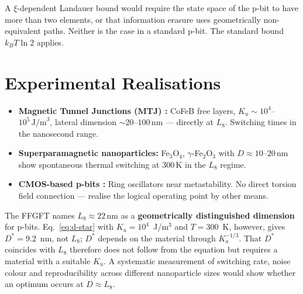 	\begin{important}
		A $\xi$-dependent Landauer bound would require the
		state space of the p-bit to have more than two elements, or that
		information erasure uses geometrically non-equivalent paths.
		Neither is the case in a standard p-bit.
		The standard bound $k_BT \ln 2$ applies.
	\end{important}
	
	\section{Experimental Realisations}
	\label{sec:experiment}
	
	\begin{itemize}
		\item \textbf{Magnetic Tunnel Junctions (MTJ) \cite{Borders2019}:}
		CoFeB free layers, $K_u \sim 10^4$--$10^5\,\text{J/m}^3$,
		lateral dimension $\sim 20$--$100\,\text{nm}$ --- directly at $L_8$.
		Switching times in the nanosecond range.
		
		\item \textbf{Superparamagnetic nanoparticles:}
		Fe$_3$O$_4$, $\gamma$-Fe$_2$O$_3$ with $D \approx 10$--$20\,\text{nm}$
		show spontaneous thermal switching at 300\,K in the
		$L_8$ regime.
		
		\item \textbf{CMOS-based p-bits \cite{Aadit2022}:}
		Ring oscillators near metastability. No direct
		torsion field connection --- realise the logical operating point
		by other means.
	\end{itemize}
	
	\begin{keypoint}
		The FFGFT names $L_8 \approx 22\,\text{nm}$ as a \textbf{geometrically
		distinguished dimension} for p-bits. Eq.~\eqref{eq:d-star} with
		$K_u = 10^4$~J/m$^3$ and $T = 300$~K, however, gives $D^* = 9.2$~nm, not $L_8$;
		$D^*$ depends on the material through $K_u^{-1/3}$. That $D^*$ coincides
		with $L_8$ therefore does not follow from the equation but requires a
		material with a suitable $K_u$.
		A systematic measurement of switching rate, noise colour and
		reproducibility across different nanoparticle sizes would
		show whether an optimum occurs at $D \approx L_8$.
	\end{keypoint}
	
